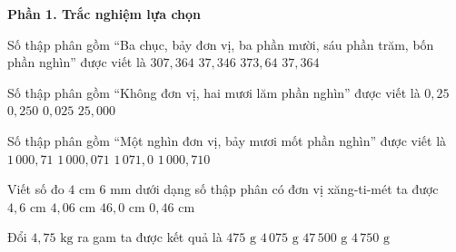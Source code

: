 \textbf{Phần 1. Trắc nghiệm lựa chọn}

\begin{ex} %
Số thập phân gồm ``Ba chục, bảy đơn vị, ba phần mười, sáu phần trăm, bốn phần nghìn'' được viết là
\choice
{$307{,}364$}
{$37{,}346$}
{$373{,}64$}
{\True $37{,}364$}
\end{ex}

\begin{ex} %
Số thập phân gồm ``Không đơn vị, hai mươi lăm phần nghìn'' được viết là
\choice
{$0{,}25$}
{$0{,}250$}
{\True $0{,}025$}
{$25{,}000$}
\end{ex}

\begin{ex} %
Số thập phân gồm ``Một nghìn đơn vị, bảy mươi mốt phần nghìn'' được viết là
\choice
{$1\,000{,}71$}
{\True $1\,000{,}071$}
{$1\,071{,}0$}
{$1\,000{,}710$}
\end{ex}

\begin{ex} %
Viết số đo $4\text{ cm } 6\text{ mm}$ dưới dạng số thập phân có đơn vị xăng-ti-mét ta được
\choice
{\True $4{,}6\text{ cm}$}
{$4{,}06\text{ cm}$}
{$46{,}0\text{ cm}$}
{$0{,}46\text{ cm}$}
\end{ex}

\begin{ex} %
Đổi $4{,}75\text{ kg}$ ra gam ta được kết quả là
\choice
{$475\text{ g}$}
{$4\,075\text{ g}$}
{$47\,500\text{ g}$}
{\True $4\,750\text{ g}$}
\end{ex}

